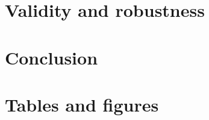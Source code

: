 \documentclass{article}
\begin{document}

\section{Validity and robustness}



\section{Conclusion}





\newpage
\onehalfspacing



\newpage
\section*{Tables and figures}
\end{document}
